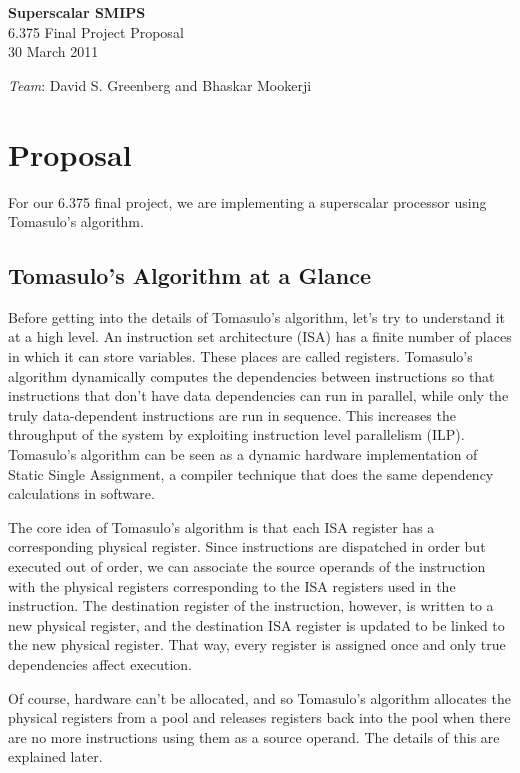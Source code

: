 \documentclass[12pt]{article}
\begin{document}
  \begin{center}
    \textbf{\large Superscalar SMIPS} \\
    6.375 Final Project Proposal\\
    30 March 2011 \\
    
    \vspace{\baselineskip}
    
    \emph{Team}: David S. Greenberg and Bhaskar Mookerji
  \end{center}


\section{Proposal}
For our 6.375 final project, we are implementing a superscalar processor using Tomasulo's algorithm.

\subsection{Tomasulo's Algorithm at a Glance}

Before getting into the details of Tomasulo's algorithm, let's try to understand it at a high level. An instruction set architecture (ISA) has a finite number of places in which
it can store variables. These places are called registers. Tomasulo's algorithm dynamically computes the dependencies between instructions so that instructions that
don't have data dependencies can run in parallel, while only the truly data-dependent instructions are run in sequence. This increases the throughput of the system by exploiting
instruction level parallelism (ILP). Tomasulo's algorithm can be seen as a dynamic hardware implementation of Static Single Assignment, a compiler technique that does
the same dependency calculations in software.

The core idea of Tomasulo's algorithm is that each ISA register has a corresponding physical register. Since instructions are dispatched in order but executed out of order,
we can associate the source operands of the instruction with the physical registers corresponding to the ISA registers used in the instruction. The destination register of
the instruction, however, is written to a new physical register, and the destination ISA register is updated to be linked to the new physical register. That way, every 
register is assigned once and only true dependencies affect execution.

Of course, hardware can't be allocated, and so Tomasulo's algorithm allocates the physical registers from a pool and releases registers back into the pool when there are
no more instructions using them as a source operand. The details of this are explained later.
\end{document}
